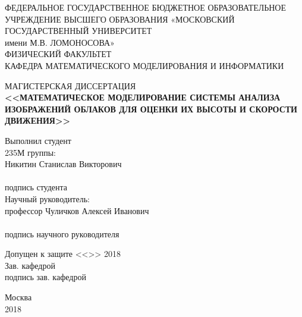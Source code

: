 \begin{titlepage}
\begin{center}
  ФЕДЕРАЛЬНОЕ ГОСУДАРСТВЕННОЕ БЮДЖЕТНОЕ ОБРАЗОВАТЕЛЬНОЕ УЧРЕЖДЕНИЕ ВЫСШЕГО ОБРАЗОВАНИЯ «МОСКОВСКИЙ ГОСУДАРСТВЕННЫЙ УНИВЕРСИТЕТ\\
  имени М.В. ЛОМОНОСОВА» \\
  ФИЗИЧЕСКИЙ ФАКУЛЬТЕТ\\
  КАФЕДРА МАТЕМАТИЧЕСКОГО МОДЕЛИРОВАНИЯ И ИНФОРМАТИКИ
\end{center}

\vfill

\begin{center}
  МАГИСТЕРСКАЯ ДИССЕРТАЦИЯ\\
  {\bf <<МАТЕМАТИЧЕСКОЕ МОДЕЛИРОВАНИЕ СИСТЕМЫ АНАЛИЗА ИЗОБРАЖЕНИЙ ОБЛАКОВ ДЛЯ ОЦЕНКИ ИХ ВЫСОТЫ И СКОРОСТИ ДВИЖЕНИЯ>>}
\end{center}

\vfill

\begin{flushright}
  Выполнил студент\\
  235М группы:\\
  Никитин Станислав Викторович\\
  \underline{\hspace{4cm}} \hspace{0.3cm} \! \\
  {\footnotesize подпись студента }\vspace{1cm}\\
  Научный руководитель: \\
  профессор Чуличков Алексей Иванович\\
  \underline{\hspace{4cm}} \hspace{0.3cm} \! \\
  {\footnotesize подпись научного руководителя }
\end{flushright}


\begin{flushleft}
Допущен к защите <<\underline{\hspace{0.8cm}}>> \underline{\hspace{1.1cm}} 2018\\
Зав. кафедрой \underline{\hspace{4cm}}\\
\hspace{4cm} {\footnotesize подпись зав. кафедрой}
\end{flushleft}

\vfill

\begin{center}
  Москва \\
  2018
\end{center}
\end{titlepage}
